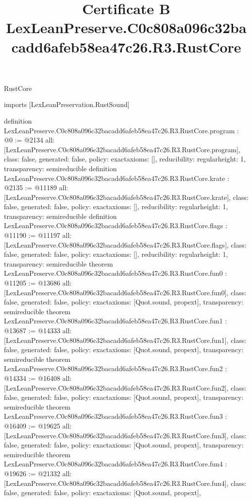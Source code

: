\begin{lexlean}{RustCore}
\title{Certificate B LexLeanPreserve.C0c808a096c32bacadd6afeb58ea47c26.R3.RustCore}
\begin{coremodule}
imports [LexLeanPreservation.RustSound]

definition LexLeanPreserve.C0c808a096c32bacadd6afeb58ea47c26.R3.RustCore.program : @0 := @2134 {
  all: [LexLeanPreserve.C0c808a096c32bacadd6afeb58ea47c26.R3.RustCore.program],
  class: false,
  generated: false,
  policy: exact{axioms: []},
  reducibility: regular{height: 1},
  transparency: semireducible
}
definition LexLeanPreserve.C0c808a096c32bacadd6afeb58ea47c26.R3.RustCore.krate : @2135 := @11189 {
  all: [LexLeanPreserve.C0c808a096c32bacadd6afeb58ea47c26.R3.RustCore.krate],
  class: false,
  generated: false,
  policy: exact{axioms: []},
  reducibility: regular{height: 1},
  transparency: semireducible
}
definition LexLeanPreserve.C0c808a096c32bacadd6afeb58ea47c26.R3.RustCore.flags : @11190 := @11197 {
  all: [LexLeanPreserve.C0c808a096c32bacadd6afeb58ea47c26.R3.RustCore.flags],
  class: false,
  generated: false,
  policy: exact{axioms: []},
  reducibility: regular{height: 1},
  transparency: semireducible
}
theorem LexLeanPreserve.C0c808a096c32bacadd6afeb58ea47c26.R3.RustCore.fun0 : @11205 := @13686 {
  all: [LexLeanPreserve.C0c808a096c32bacadd6afeb58ea47c26.R3.RustCore.fun0],
  class: false,
  generated: false,
  policy: exact{axioms: [Quot.sound, propext]},
  transparency: semireducible
}
theorem LexLeanPreserve.C0c808a096c32bacadd6afeb58ea47c26.R3.RustCore.fun1 : @13687 := @14333 {
  all: [LexLeanPreserve.C0c808a096c32bacadd6afeb58ea47c26.R3.RustCore.fun1],
  class: false,
  generated: false,
  policy: exact{axioms: [Quot.sound, propext]},
  transparency: semireducible
}
theorem LexLeanPreserve.C0c808a096c32bacadd6afeb58ea47c26.R3.RustCore.fun2 : @14334 := @16408 {
  all: [LexLeanPreserve.C0c808a096c32bacadd6afeb58ea47c26.R3.RustCore.fun2],
  class: false,
  generated: false,
  policy: exact{axioms: [Quot.sound, propext]},
  transparency: semireducible
}
theorem LexLeanPreserve.C0c808a096c32bacadd6afeb58ea47c26.R3.RustCore.fun3 : @16409 := @19625 {
  all: [LexLeanPreserve.C0c808a096c32bacadd6afeb58ea47c26.R3.RustCore.fun3],
  class: false,
  generated: false,
  policy: exact{axioms: [Quot.sound, propext]},
  transparency: semireducible
}
theorem LexLeanPreserve.C0c808a096c32bacadd6afeb58ea47c26.R3.RustCore.fun4 : @19626 := @21332 {
  all: [LexLeanPreserve.C0c808a096c32bacadd6afeb58ea47c26.R3.RustCore.fun4],
  class: false,
  generated: false,
  policy: exact{axioms: [Quot.sound, propext]},
}
\end{coremodule}
\end{lexlean}
